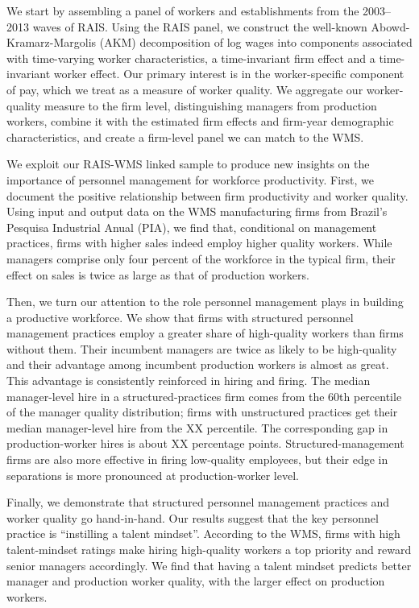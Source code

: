 We start by assembling a panel of workers and establishments from the 2003–2013 waves of RAIS.  Using the RAIS panel, we construct the well-known Abowd-Kramarz-Margolis (AKM) decomposition  of log wages \citep{Abowd1999} into components associated with time-varying worker characteristics, a time-invariant firm effect and a time-invariant worker effect. Our primary interest is in the worker-specific component of pay, which we treat as a measure of worker quality.  We aggregate our worker-quality measure to the firm level, distinguishing managers from production workers, combine it with the estimated firm effects and firm-year demographic characteristics, and create a firm-level panel we can match to the WMS. 

We exploit our RAIS-WMS linked sample to produce new insights on the importance of personnel management for workforce productivity. First, we document the positive relationship between firm productivity and worker quality.  Using input and output data on the WMS manufacturing firms from Brazil's Pesquisa Industrial Anual (PIA), we find that, conditional on management practices, firms with higher sales indeed employ higher quality workers. While managers comprise only four percent of the workforce in the typical firm, their effect on sales is twice as large as that of production workers. %

Then, we turn our attention to the role personnel management plays in building a productive workforce. We show that firms with structured personnel management practices employ a greater share of high-quality workers than firms without them.  Their incumbent managers are twice as likely to be high-quality and their advantage among incumbent production workers is almost as great. This advantage is consistently reinforced in hiring and firing. The median manager-level hire in a structured-practices firm comes from the 60th percentile of the manager quality distribution; firms with unstructured practices get their median manager-level hire from the XX percentile. The corresponding gap in production-worker hires is about XX percentage points. Structured-management firms are also more effective in firing low-quality employees, but their edge in separations is more pronounced at production-worker level. 

Finally, we demonstrate that structured personnel management practices and worker quality go hand-in-hand.  Our results suggest that the key personnel practice is ``instilling a talent mindset''. According to the WMS, firms with high talent-mindset ratings make hiring high-quality workers a top priority and reward senior managers accordingly. We find that having a talent mindset predicts better manager and production worker quality, with the larger effect on production workers.

